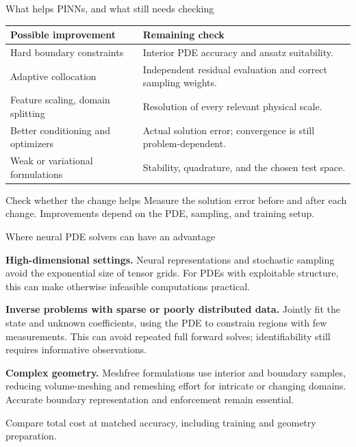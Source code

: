 \renewcommand{\slideid}{L3-C09}
\begin{frame}[c]{What helps PINNs, and what still needs checking}
\small
\renewcommand{\arraystretch}{1.4}
\begin{tabular}{@{}>{\raggedright\arraybackslash}p{}>{\raggedright\arraybackslash}p{}@{}}
\toprule
Possible improvement & Remaining check\\
\midrule
Hard boundary constraints & Interior PDE accuracy and ansatz suitability.\\
Adaptive collocation & Independent residual evaluation and correct sampling weights.\\
Feature scaling, domain splitting & Resolution of every relevant physical scale.\\
Better conditioning and optimizers & Actual solution error; convergence is still problem-dependent.\\
Weak or variational formulations & Stability, quadrature, and the chosen test space.\\
\bottomrule
\end{tabular}
\begin{block}{Check whether the change helps}
Measure the solution error before and after each change. Improvements
depend on the PDE, sampling, and training setup.
\end{block}
\end{frame}

\renewcommand{\slideid}{L3-C11}
\begin{frame}[c]{Where neural PDE solvers can have an advantage}
\small
\begin{slideitems}
\setlength\itemsep{0.8em}
\item \textbf{High-dimensional settings.} Neural representations and stochastic
sampling avoid the exponential size of tensor grids. For PDEs with exploitable
structure, this can make otherwise infeasible computations practical.
\item \textbf{Inverse problems with sparse or poorly distributed data.}
Jointly fit the state and unknown coefficients, using the PDE to constrain
regions with few measurements. This can avoid repeated full forward solves;
identifiability still requires informative observations.
\item \textbf{Complex geometry.} Meshfree formulations use interior and boundary
samples, reducing volume-meshing and remeshing effort for intricate or changing
domains. Accurate boundary representation and enforcement remain essential.
\end{slideitems}
\par\medskip
Compare total cost at matched accuracy, including training and geometry preparation.
\par\medskip
{}
\end{frame}

\renewcommand{\slideid}{L3}
